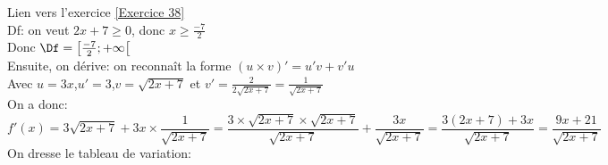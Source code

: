 \documentclass[12pt,fleqn]{report} %
\begin{document}
\begin{correction}Lien vers l'exercice   \ref{Exercice 38}\\
	Df: on veut $2x+7\geq 0$, donc $x\geq \frac{-7}{2}$\\[2mm]
	Donc $\Df = \left[\frac{-7}{2};+\infty\right[$\\[2mm]
	Ensuite, on dérive: on reconnaît la forme $(u\times v)' =u'v+v'u$ \\[2mm]
	Avec $u= 3x$,\quad $u'=3$,\quad $v= \sqrt{2x+7}$ et $v'=\frac{2}{2\sqrt{2x+7}}= \frac{1}{\sqrt{2x+7}}$\\[2mm]
	On a donc: \\[2mm]
	\[
	f'(x)= 3\sqrt{2x+7}+ 3x\times \frac{1}{\sqrt{2x+7}}= \frac{3\times \sqrt{2x+7} \times \sqrt{2x+7}}{\sqrt{2x+7}}+ \frac{3x}{\sqrt{2x+7}}= \frac{3(2x+7)+3x}{\sqrt{2x+7}}= \frac{9x+21}{\sqrt{2x+7}}
	\]
	On dresse le tableau de variation:\\[2mm]
	\begin{center}
	\end{center}
\end{correction}
\end{document}
